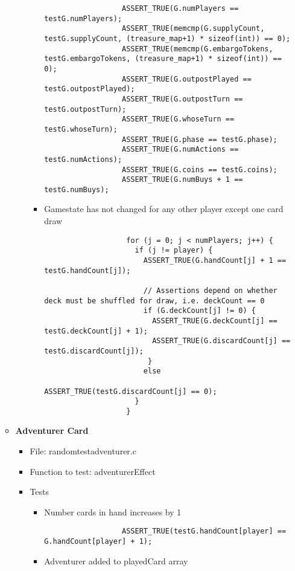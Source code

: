 \documentclass[11pt,letterpaper]{article}
\begin{document}
\begin{enumerate}[label=\arabic*., leftmargin=*]
\begin{itemize}[leftmargin=*]
\begin{itemize}[leftmargin=*]
\begin{itemize}[leftmargin=*]
                  \begin{lstlisting}
                  ASSERT_TRUE(G.numPlayers == testG.numPlayers);
                  ASSERT_TRUE(memcmp(G.supplyCount, testG.supplyCount, (treasure_map+1) * sizeof(int)) == 0);
                  ASSERT_TRUE(memcmp(G.embargoTokens, testG.embargoTokens, (treasure_map+1) * sizeof(int)) == 0);
                  ASSERT_TRUE(G.outpostPlayed == testG.outpostPlayed);
                  ASSERT_TRUE(G.outpostTurn == testG.outpostTurn);
                  ASSERT_TRUE(G.whoseTurn == testG.whoseTurn);
                  ASSERT_TRUE(G.phase == testG.phase); 
                  ASSERT_TRUE(G.numActions == testG.numActions); 
                  ASSERT_TRUE(G.coins == testG.coins); 
                  ASSERT_TRUE(G.numBuys + 1 == testG.numBuys); 
                  \end{lstlisting}

              \item Gamestate has not changed for any other player except one card draw
                  \begin{lstlisting}
                   for (j = 0; j < numPlayers; j++) {
                     if (j != player) {
                       ASSERT_TRUE(G.handCount[j] + 1 == testG.handCount[j]);
                   
                       // Assertions depend on whether deck must be shuffled for draw, i.e. deckCount == 0
                       if (G.deckCount[j] != 0) {
                         ASSERT_TRUE(G.deckCount[j] == testG.deckCount[j] + 1);
                         ASSERT_TRUE(G.discardCount[j] == testG.discardCount[j]);
                        }
                       else
                         ASSERT_TRUE(testG.discardCount[j] == 0);
                     }
                   }
                  \end{lstlisting}
          \end{itemize}
      \end{itemize}

      \item \textbf{Adventurer Card}
        \begin{itemize}[leftmargin=*]
          \item File: randomtestadventurer.c
          \item Function to test: adventurerEffect
          \item Tests
        \begin{itemize}[leftmargin=*]
              \item Number cards in hand increases by 1
                  \begin{lstlisting}
                  ASSERT_TRUE(testG.handCount[player] == G.handCount[player] + 1);
                  \end{lstlisting}
              \item Adventurer added to playedCard array


\end{itemize}
\end{itemize}
\end{itemize}
\end{enumerate}
\end{document}
